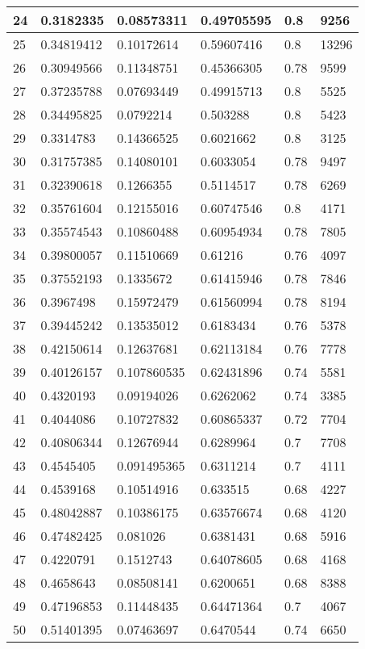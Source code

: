 \begin{longtable}{|l|l|l|l|l|l|}
24 & 0.3182335 & 0.08573311 & 0.49705595 & 0.8 & 9256 \\ \hline 
25 & 0.34819412 & 0.10172614 & 0.59607416 & 0.8 & 13296 \\ \hline 
26 & 0.30949566 & 0.11348751 & 0.45366305 & 0.78 & 9599 \\ \hline 
27 & 0.37235788 & 0.07693449 & 0.49915713 & 0.8 & 5525 \\ \hline 
28 & 0.34495825 & 0.0792214 & 0.503288 & 0.8 & 5423 \\ \hline 
29 & 0.3314783 & 0.14366525 & 0.6021662 & 0.8 & 3125 \\ \hline 
30 & 0.31757385 & 0.14080101 & 0.6033054 & 0.78 & 9497 \\ \hline 
31 & 0.32390618 & 0.1266355 & 0.5114517 & 0.78 & 6269 \\ \hline 
32 & 0.35761604 & 0.12155016 & 0.60747546 & 0.8 & 4171 \\ \hline 
33 & 0.35574543 & 0.10860488 & 0.60954934 & 0.78 & 7805 \\ \hline 
34 & 0.39800057 & 0.11510669 & 0.61216 & 0.76 & 4097 \\ \hline 
35 & 0.37552193 & 0.1335672 & 0.61415946 & 0.78 & 7846 \\ \hline 
36 & 0.3967498 & 0.15972479 & 0.61560994 & 0.78 & 8194 \\ \hline 
37 & 0.39445242 & 0.13535012 & 0.6183434 & 0.76 & 5378 \\ \hline 
38 & 0.42150614 & 0.12637681 & 0.62113184 & 0.76 & 7778 \\ \hline 
39 & 0.40126157 & 0.107860535 & 0.62431896 & 0.74 & 5581 \\ \hline 
40 & 0.4320193 & 0.09194026 & 0.6262062 & 0.74 & 3385 \\ \hline 
41 & 0.4044086 & 0.10727832 & 0.60865337 & 0.72 & 7704 \\ \hline 
42 & 0.40806344 & 0.12676944 & 0.6289964 & 0.7 & 7708 \\ \hline 
43 & 0.4545405 & 0.091495365 & 0.6311214 & 0.7 & 4111 \\ \hline 
44 & 0.4539168 & 0.10514916 & 0.633515 & 0.68 & 4227 \\ \hline 
45 & 0.48042887 & 0.10386175 & 0.63576674 & 0.68 & 4120 \\ \hline 
46 & 0.47482425 & 0.081026 & 0.6381431 & 0.68 & 5916 \\ \hline 
47 & 0.4220791 & 0.1512743 & 0.64078605 & 0.68 & 4168 \\ \hline 
48 & 0.4658643 & 0.08508141 & 0.6200651 & 0.68 & 8388 \\ \hline 
49 & 0.47196853 & 0.11448435 & 0.64471364 & 0.7 & 4067 \\ \hline 
50 & 0.51401395 & 0.07463697 & 0.6470544 & 0.74 & 6650 \\ \hline 
\end{longtable}